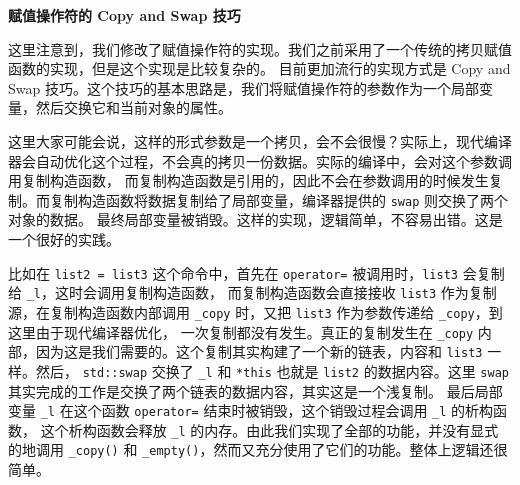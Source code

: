 \documentclass[a4paper]{ctexart}
\theoremstyle{definition}
\theoremstyle{definition}
\begin{document}
 
 


{\textbf{赋值操作符的 Copy and Swap 技巧}}

这里注意到，我们修改了赋值操作符的实现。我们之前采用了一个传统的拷贝赋值函数的实现，但是这个实现是比较复杂的。
目前更加流行的实现方式是 Copy and Swap 技巧。这个技巧的基本思路是，我们将赋值操作符的参数作为一个局部变量，然后交换它和当前对象的属性。

这里大家可能会说，这样的形式参数是一个拷贝，会不会很慢？实际上，现代编译器会自动优化这个过程，不会真的拷贝一份数据。实际的编译中，会对这个参数调用复制构造函数，
而复制构造函数是引用的，因此不会在参数调用的时候发生复制。而复制构造函数将数据复制给了局部变量，编译器提供的 \verb|swap| 则交换了两个对象的数据。
最终局部变量被销毁。这样的实现，逻辑简单，不容易出错。这是一个很好的实践。

比如在 \verb|list2 = list3| 这个命令中，首先在 \verb|operator=| 被调用时，\verb|list3| 会复制给 \verb|_l|，这时会调用复制构造函数，
而复制构造函数会直接接收 \verb|list3| 作为复制源，在复制构造函数内部调用 \verb|_copy| 时，又把 \verb|list3| 作为参数传递给 \verb|_copy|，到这里由于现代编译器优化，
一次复制都没有发生。真正的复制发生在 \verb|_copy| 内部，因为这是我们需要的。这个复制其实构建了一个新的链表，内容和 \verb|list3| 一样。然后，
\verb|std::swap| 交换了 \verb|_l| 和 \verb|*this| 也就是 \verb|list2| 的数据内容。这里 \verb|swap| 其实完成的工作是交换了两个链表的数据内容，其实这是一个浅复制。
最后局部变量 \verb|_l| 在这个函数 \verb|operator=| 结束时被销毁，这个销毁过程会调用 \verb|_l| 的析构函数，
这个析构函数会释放 \verb|_l| 的内存。由此我们实现了全部的功能，并没有显式的地调用 \verb|_copy()| 和 \verb|_empty()|，然而又充分使用了它们的功能。整体上逻辑还很简单。
\end{document}
